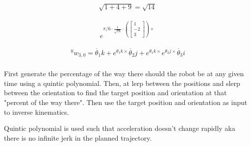 \begin{solutionbox}[Q1-2-iii]

    \begin{align*}
        \sqrt{1+4+9} = \sqrt{14}
    \end{align*}

    \begin{align*}
        e^{\pi/6\cdot \frac{1}{\sqrt{14}} \cdot \left(\begin{bmatrix}1\\-2\\3\end{bmatrix}\right)\times}
    \end{align*}
\end{solutionbox}

\begin{solutionbox}[Q1-3]
    \begin{align*}
        {\,^0w_{3,0}} = \dot{\theta_1} k + e^{\theta_1 k\times} \dot{\theta_2} j + e^{\theta_1 k\times} e^{\theta_2 j\times} \dot{\theta_3} i \\
    \end{align*}
\end{solutionbox}


\begin{solutionbox}[Q1-4]
    First generate the percentage of the way there should the robot be at any given time using a quintic polynomial. Then, at lerp between the positions and slerp between the orientation to find the target position and orientation at that "percent of the way there". Then use the target position and orientation as input to inverse kinematics.

    Quintic polynomial is used such that acceleration doesn't change rapidly aka there is no infinite jerk in the planned trajectory.
\end{solutionbox}

